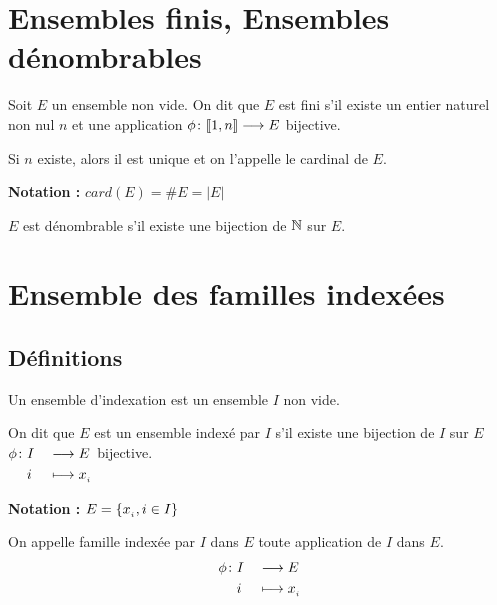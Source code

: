 \documentclass[12pt,twoside,a4paper]{article}
\author{MPSI 2}
\begin{document}
	\maketitle
	\section{Ensembles finis, Ensembles d\'enombrables}
		\begin{defi}
			Soit $E$ un ensemble non vide. On dit que $E$ est fini s'il existe un entier naturel non nul $n$ et une application $\phi\colon[\![1,n]\!]\longrightarrow E$ bijective.
		\end{defi}
		\begin{prop}
			Si $n$ existe, alors il est unique et on l'appelle le cardinal de $E$.
		\end{prop}
		\textbf{Notation :} $card(E)=\#E=|E|$
		\begin{defi}
			$E$ est d\'enombrable s'il existe une bijection de $\mathbb{N}$ sur $E$.
		\end{defi}
	\section{Ensemble des familles index\'ees}
		\subsection{D\'efinitions}
			Un ensemble d'indexation est un ensemble $I$ non vide.
			\begin{defi}
				On dit que $E$ est un ensemble index\'e par $I$ s'il existe une bijection de $I$ sur $E$ $\begin{aligned}[t]\phi\colon&I&&\longrightarrow E \\&i&&\longmapsto x_{_{i}}\end{aligned}$ bijective.
			\end{defi}
			\textbf{Notation :} $E=\left\{x_{_{i}},i\in I\right\}$
			\begin{defi}
				On appelle famille index\'ee par $I$ dans $E$ toute application de $I$ dans $E$.
				$$\begin{aligned}[t]\phi\colon&I&&\longrightarrow E \\&i&&\longmapsto x_{_{i}}\end{aligned}$$
			\end{defi}
\end{document}
